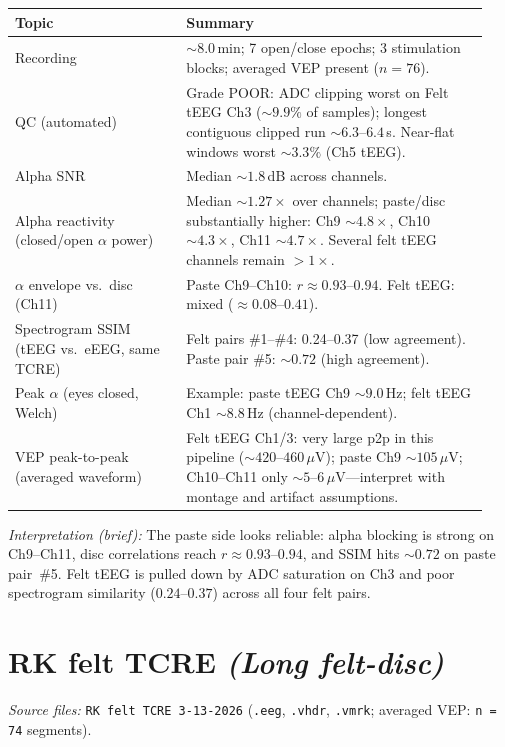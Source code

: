 \documentclass[11pt]{article}
\begin{document}
\begin{table}[h]
  \centering
  \small
  \begin{tabular}{@{}p{0.34\linewidth}p{0.60\linewidth}@{}}
    \toprule
    \textbf{Topic} & \textbf{Summary} \\
    \midrule
    Recording & ${\sim}8.0$\,min; 7 open/close epochs; 3 stimulation blocks; averaged VEP present ($n=76$). \\
    QC (automated) & Grade POOR: ADC clipping worst on Felt tEEG Ch3 (${\sim}9.9\%$ of samples); longest contiguous clipped run ${\sim}6.3$--$6.4$\,s. Near-flat windows worst ${\sim}3.3\%$ (Ch5 tEEG). \\
    Alpha SNR & Median ${\sim}1.8$\,dB across channels. \\
    Alpha reactivity (closed/open $\alpha$ power) & Median ${\sim}1.27\times$ over channels; paste/disc substantially higher: Ch9 ${\sim}4.8\times$, Ch10 ${\sim}4.3\times$, Ch11 ${\sim}4.7\times$. Several felt tEEG channels remain $>1\times$. \\
    $\alpha$ envelope vs.\ disc (Ch11) & Paste Ch9--Ch10: $r \approx 0.93$--$0.94$. Felt tEEG: mixed ($\approx 0.08$--$0.41$). \\
    Spectrogram SSIM (tEEG vs.\ eEEG, same TCRE) & Felt pairs \#1--\#4: 0.24--0.37 (low agreement). Paste pair \#5: ${\sim}0.72$ (high agreement). \\
    Peak $\alpha$ (eyes closed, Welch) & Example: paste tEEG Ch9 ${\sim}9.0$\,Hz; felt tEEG Ch1 ${\sim}8.8$\,Hz (channel-dependent). \\
    VEP peak-to-peak (averaged waveform) & Felt tEEG Ch1/3: very large p2p in this pipeline (${\sim}420$--$460$\,$\mu$V); paste Ch9 ${\sim}105$\,$\mu$V; Ch10--Ch11 only ${\sim}5$--$6$\,$\mu$V---interpret with montage and artifact assumptions. \\
    \bottomrule
  \end{tabular}
\end{table}

\noindent\textit{Interpretation (brief):} The paste side looks reliable: alpha blocking is strong on Ch9--Ch11, disc correlations reach $r \approx 0.93$--$0.94$, and SSIM hits ${\sim}0.72$ on paste pair~\#5. Felt tEEG is pulled down by ADC saturation on Ch3 and poor spectrogram similarity ($0.24$--$0.37$) across all four felt pairs.

\section*{RK felt TCRE \textnormal{\textit{(Long felt-disc)}}}
\textit{Source files:} \texttt{RK felt TCRE 3-13-2026} (\texttt{.eeg}, \texttt{.vhdr}, \texttt{.vmrk}; averaged VEP: \texttt{n\,=\,74} segments).
\end{document}

